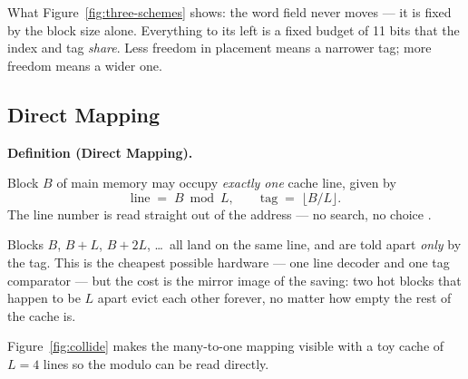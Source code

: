 \documentclass[11pt]{article}
\newenvironment{definitionbox}[1]{%
  \par\noindent\textbf{Definition (#1).}\ \itshape
}{\par\vspace{0.3em}}
\begin{document}
What Figure~\ref{fig:three-schemes} shows: the word field never moves --- it is fixed by the block size alone. Everything to its left is a fixed budget of 11 bits that the index and tag \emph{share}. Less freedom in placement means a narrower tag; more freedom means a wider one.

\subsection{Direct Mapping}
\label{sec:direct}

\begin{definitionbox}{Direct Mapping}
Block $B$ of main memory may occupy \emph{exactly one} cache line, given by
\[
  \text{line} \;=\; B \bmod L ,
  \qquad
  \text{tag} \;=\; \lfloor B / L \rfloor .
\]
The line number is read straight out of the address --- no search, no choice \cite[Fig.~5.7, PDF p.~190]{Stallings2015_computer_organization}.
\end{definitionbox}

Blocks $B$, $B+L$, $B+2L$, \dots\ all land on the same line, and are told apart \emph{only} by the tag. This is the cheapest possible hardware --- one line decoder and one tag comparator --- but the cost is the mirror image of the saving: two hot blocks that happen to be $L$ apart evict each other forever, no matter how empty the rest of the cache is.

Figure~\ref{fig:collide} makes the many-to-one mapping visible with a toy cache of $L=4$ lines so the modulo can be read directly.
\end{document}

